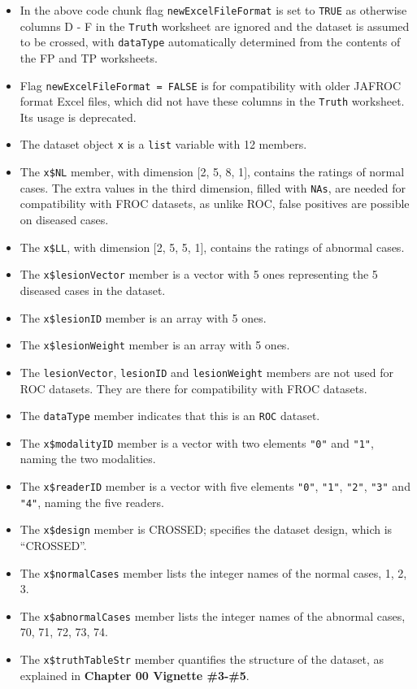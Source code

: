 \documentclass[]{book}
\providecommand{\tightlist}{%
  \setlength{\itemsep}{0pt}\setlength{\parskip}{0pt}}
\begin{document}
\begin{itemize}
\tightlist
\item
  In the above code chunk flag \texttt{newExcelFileFormat} is set to \texttt{TRUE} as otherwise columns D - F in the \texttt{Truth} worksheet are ignored and the dataset is assumed to be crossed, with \texttt{dataType} automatically determined from the contents of the FP and TP worksheets.
\item
  Flag \texttt{newExcelFileFormat\ =\ FALSE} is for compatibility with older JAFROC format Excel files, which did not have these columns in the \texttt{Truth} worksheet. Its usage is deprecated.
\item
  The dataset object \texttt{x} is a \texttt{list} variable with 12 members.
\item
  The \texttt{x\$NL} member, with dimension {[}2, 5, 8, 1{]}, contains the ratings of normal cases. The extra values in the third dimension, filled with \texttt{NAs}, are needed for compatibility with FROC datasets, as unlike ROC, false positives are possible on diseased cases.
\item
  The \texttt{x\$LL}, with dimension {[}2, 5, 5, 1{]}, contains the ratings of abnormal cases.
\item
  The \texttt{x\$lesionVector} member is a vector with 5 ones representing the 5 diseased cases in the dataset.
\item
  The \texttt{x\$lesionID} member is an array with 5 ones.
\item
  The \texttt{x\$lesionWeight} member is an array with 5 ones.
\item
  The \texttt{lesionVector}, \texttt{lesionID} and \texttt{lesionWeight} members are not used for ROC datasets. They are there for compatibility with FROC datasets.
\item
  The \texttt{dataType} member indicates that this is an \texttt{ROC} dataset.
\item
  The \texttt{x\$modalityID} member is a vector with two elements \texttt{"0"} and \texttt{"1"}, naming the two modalities.
\item
  The \texttt{x\$readerID} member is a vector with five elements \texttt{"0"}, \texttt{"1"}, \texttt{"2"}, \texttt{"3"} and \texttt{"4"}, naming the five readers.
\item
  The \texttt{x\$design} member is CROSSED; specifies the dataset design, which is ``CROSSED''.
\item
  The \texttt{x\$normalCases} member lists the integer names of the normal cases, 1, 2, 3.
\item
  The \texttt{x\$abnormalCases} member lists the integer names of the abnormal cases, 70, 71, 72, 73, 74.
\item
  The \texttt{x\$truthTableStr} member quantifies the structure of the dataset, as explained in \textbf{Chapter 00 Vignette \#3-\#5}.
\end{itemize}
\end{document}
